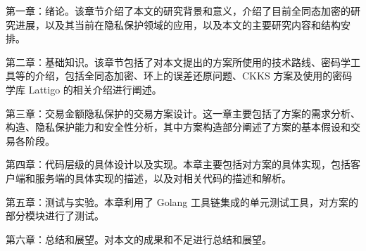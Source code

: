 第一章：绪论。该章节介绍了本文的研究背景和意义，介绍了目前全同态加密的研究进展，以及其当前在隐私保护领域的应用，以及本文的主要研究内容和结构安排。

第二章：基础知识。该章节包括了对本文提出的方案所使用的技术路线、密码学工具等的介绍，包括全同态加密、环上的误差还原问题、CKKS 方案及使用的密码学库 Lattigo 的相关介绍进行阐述。

第三章：交易金额隐私保护的交易方案设计。这一章主要包括了方案的需求分析、构造、隐私保护能力和安全性分析，其中方案构造部分阐述了方案的基本假设和交易各阶段。

第四章：代码层级的具体设计以及实现。本章主要包括对方案的具体实现，包括客户端和服务端的具体实现的描述，以及对相关代码的描述和解析。

第五章：测试与实验。本章利用了 Golang 工具链集成的单元测试工具，对方案的部分模块进行了测试。

第六章：总结和展望。对本文的成果和不足进行总结和展望。
